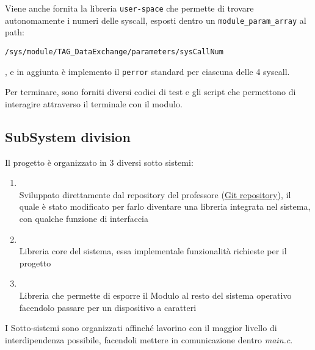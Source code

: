 Viene anche fornita la libreria \texttt{user-space} che permette di trovare autonomamente i numeri delle syscall,
esposti dentro un \verb|module_param_array| al path:
\begin{footnotesize}\verb|/sys/module/TAG_DataExchange/parameters/sysCallNum|\end{footnotesize}, e in aggiunta è
implemento il
\texttt{perror} standard per ciascuna delle 4 syscall.

Per terminare, sono forniti diversi codici di test e gli script che permettono di interagire attraverso il terminale
con il modulo.

\subsection{SubSystem division}

Il progetto è organizzato in 3 diversi sotto sistemi:
\begin{enumerate}
    \item {} \\
    Sviluppato direttamente dal repository del professore
    (\href{https://github.com/FrancescoQuaglia/Linux-sys_call_table-discoverer}{Git repository}), il quale è stato
    modificato per farlo diventare una libreria integrata nel sistema, con qualche funzione di interfaccia
    \item {} \\
    Libreria core del sistema, essa implementale funzionalità richieste per il progetto
    \item {} \\
    Libreria che permette di esporre il Modulo al resto del sistema operativo facendolo passare per un dispositivo a
    caratteri
\end{enumerate}

I Sotto-sistemi sono organizzati affinché lavorino con il maggior livello di interdipendenza possibile, facendoli
mettere in
comunicazione dentro \textit{main.c}.
